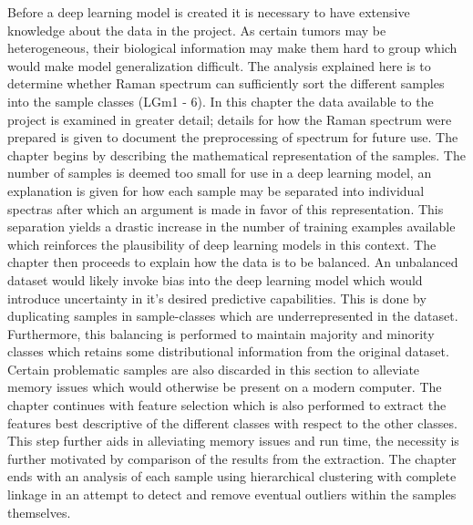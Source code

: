 Before a deep learning model is created it is necessary to have extensive knowledge about the data in the project. As certain tumors may be heterogeneous\cite{friedmann2014glioblastoma}, their biological information may make them hard to group which would make model generalization difficult. The analysis explained here is to determine whether Raman spectrum can sufficiently sort the different samples into the sample classes (LGm1 - 6). In this chapter the data available to the project is examined in greater detail; details for how the Raman spectrum were prepared is given to document the preprocessing of spectrum for future use. The chapter begins by describing the mathematical representation of the samples. The number of samples is deemed too small for use in a deep learning model, an explanation is given for how each sample may be separated into individual spectras after which an argument is made in favor of this representation. This separation yields a drastic increase in the number of training examples available which reinforces the plausibility of deep learning models in this context. The chapter then proceeds to explain how the data is to be balanced. An unbalanced dataset would likely invoke bias into the deep learning model which would introduce uncertainty in it's desired predictive capabilities. This is done by duplicating samples in sample-classes which are underrepresented in the dataset. Furthermore, this balancing is performed to maintain majority and minority classes which retains some distributional information from the original dataset. Certain problematic samples are also discarded in this section to alleviate memory issues which would otherwise be present on a modern computer. The chapter continues with feature selection which is also performed to extract the features best descriptive of the different classes with respect to the other classes. This step further aids in alleviating memory issues and run time, the necessity is further motivated by comparison of the results from the extraction. The chapter ends with an analysis of each sample using hierarchical clustering with complete linkage in an attempt to detect and remove eventual outliers within the samples themselves.


